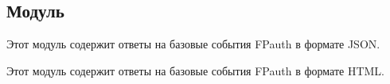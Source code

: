 \subsection{Модуль }\label{page-FPauth-responses-module-FPauth+u+responses}%
\label{page-FPauth-responses-module-FPauth+u+responses-module-JSON}\begin{ocamlindent}Этот модуль содержит ответы на базовые события FPauth в формате JSON.\end{ocamlindent}%
\medbreak
\label{page-FPauth-responses-module-FPauth+u+responses-module-HTML}\begin{ocamlindent}Этот модуль содержит ответы на базовые события FPauth в формате HTML.\end{ocamlindent}%
\medbreak



